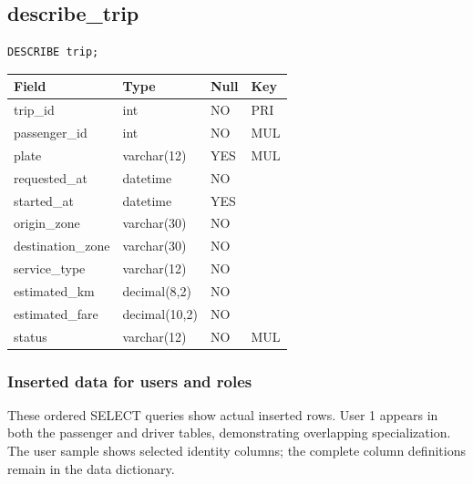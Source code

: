 \documentclass[11pt,a4paper]{article}
\begin{document}
\begin{minipage}[t]{.68\linewidth}
\begin{minipage}{\linewidth}
\subsection*{describe\_\allowbreak{}trip}
\begin{lstlisting}
DESCRIBE trip;
\end{lstlisting}
\par\begingroup\small\noindent
\begin{tabularx}{\linewidth}{YYYY}
\toprule
Field & Type & Null & Key\\\midrule
trip\_\allowbreak{}id & int & NO & PRI\\
passenger\_\allowbreak{}id & int & NO & MUL\\
plate & varchar(12) & YES & MUL\\
requested\_\allowbreak{}at & datetime & NO & \\
started\_\allowbreak{}at & datetime & YES & \\
origin\_\allowbreak{}zone & varchar(30) & NO & \\
destination\_\allowbreak{}zone & varchar(30) & NO & \\
service\_\allowbreak{}type & varchar(12) & NO & \\
estimated\_\allowbreak{}km & decimal(8,2) & NO & \\
estimated\_\allowbreak{}fare & decimal(10,2) & NO & \\
status & varchar(12) & NO & MUL\\
\bottomrule
\end{tabularx}
\par\endgroup
\end{minipage}\par\vspace{5pt}
\end{minipage}
\subsubsection*{Inserted data for users and roles}
These ordered SELECT queries show actual inserted rows. User 1 appears in both the passenger and driver tables, demonstrating overlapping specialization. The user sample shows selected identity columns; the complete column definitions remain in the data dictionary.
\end{document}

